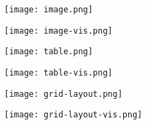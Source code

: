 \begin{figure*}[h]
  \begin{gridlayout}{\textwidth}{10cm}
    \begin{row}{0.264}
      \begin{cell}{0.5}
        \raggedleft
        \texttt{[image: image.png]}
      \end{cell}
      \begin{cell}{0.5}
        \raggedright
        \texttt{[image: image-vis.png]}
      \end{cell}
    \end{row}
    \begin{row}{0.268}
      \begin{cell}{0.5}
        \raggedleft
        \texttt{[image: table.png]}
      \end{cell}
      \begin{cell}{0.5}
        \raggedright
        \texttt{[image: table-vis.png]}
      \end{cell}
    \end{row}
    \begin{row}{0.468}
      \begin{cell}{0.5}
        \raggedleft
        \texttt{[image: grid-layout.png]}
      \end{cell}
      \begin{cell}{0.5}
        \raggedright
        \texttt{[image: grid-layout-vis.png]}
      \end{cell}
    \end{row}
  \end{gridlayout}
  

\end{figure*}
